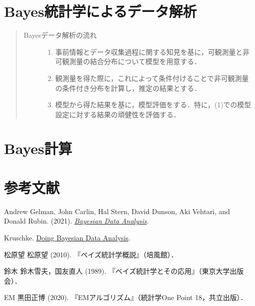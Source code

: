 \documentclass[uplatex,dvipdfmx]{jsreport}
\begin{document}
\chapter{Bayes統計学によるデータ解析}

\begin{quotation}
    \begin{description}
        \item[Bayesデータ解析の流れ] \begin{enumerate}
            \item 事前情報とデータ収集過程に関する知見を基に，可観測量と非可観測量の結合分布について模型を用意する．
            \item 観測量を得た際に，これによって条件付けることで非可観測量の条件付き分布を計算し，推定の結果とする．
            \item 模型から得た結果を基に，模型評価をする．特に，(1)での模型設定に対する結果の頑健性を評価する．
        \end{enumerate}
    \end{description}
\end{quotation}

\chapter{Bayes計算}

\chapter{参考文献}


\begin{thebibliography}{99}
    \item 
    Andrew Gelman, John Carlin, Hal Stern, David Dunson, Aki Vehtari, and Donald Rubin. (2021). \href{http://www.stat.columbia.edu/~gelman/book/}{\textit{Bayesian Data Analysis}}.
    \item
    Kruschke. \href{https://sites.google.com/site/doingbayesiandataanalysis/}{Doing Bayesian Data Analysis}.

    \item{松原望}
    松原望 (2010). 『ベイズ統計学概説』（培風館）．
    \item{鈴木}
    鈴木雪夫，国友直人 (1989). 『ベイズ統計学とその応用』（東京大学出版会）．

    \item{EM}
    黒田正博 (2020). 『EMアルゴリズム』（統計学One Point 18，共立出版）．
\end{thebibliography}
\end{document}
